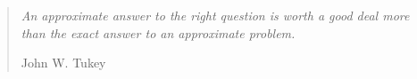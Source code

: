 \begin{quote}
\textit{An approximate answer to the right question is worth a good deal more than the exact answer to an approximate problem.}

\hfill John W. Tukey
\end{quote}
